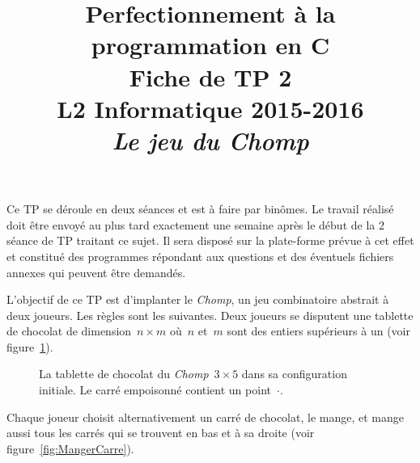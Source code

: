 \documentclass[12pt]{article}
\date{}
\title{{\bf Perfectionnement à la programmation en {\sf C}} \\
    Fiche de TP 2 \\
    {\small L2 Informatique 2015-2016} \\
    {\it \small Le jeu du Chomp}}
\theoremstyle{definition}
\begin{document}
\maketitle

Ce TP se déroule en deux séances et est à faire par binômes.
Le travail réalisé doit être envoyé au plus tard exactement une
semaine après le début de la 2\ieme{} séance de TP traitant ce sujet. Il
sera disposé sur la plate-forme prévue à cet effet et constitué des
programmes répondant aux questions et des éventuels fichiers annexes qui
peuvent être demandés.
\bigskip
\bigskip

L'objectif de ce TP est d'implanter le {\em Chomp}, un jeu combinatoire
abstrait à deux joueurs. Les règles sont les suivantes. Deux joueurs se
disputent une tablette de chocolat de dimension~$n \times m$ où~$n$ et~$m$
sont des entiers supérieurs à un (voir figure~\ref{fig:Chomp3x5}).
\begin{figure}[ht]
    \centering
    \caption{La tablette de chocolat du {\em Chomp}~$3 \times 5$
    dans sa configuration initiale. Le carré empoisonné contient un
    point~$\cdot$.}
    \label{fig:Chomp3x5}
\end{figure}
Chaque joueur choisit alternativement un carré de chocolat, le mange, et
mange aussi tous les carrés qui se trouvent en bas et à sa droite
(voir figure~\ref{fig:MangerCarre}).
\end{document}
